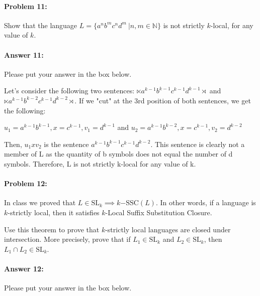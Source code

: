\documentclass[10pt]{article}
\newenvironment{AnswerBox}{\begin{mdframed}[style=simple]}{\end{mdframed}}
\begin{document}
\hrulefill %

\paragraph{Problem 11:}

Show that the language $L= \{a^n b^m c^n d^m\ | n, m \in \mathbb{N} \}$ is not
strictly $k$-local, for any value of $k$.

\paragraph{Answer 11:} Please put your answer in the box below.


\begin{AnswerBox}%
Let's consider the following two sentences: $\ltimes a^{k-1} b^{k-1} c^{k-1} d^{k-1} \rtimes$ and $\ltimes a^{k-1} b^{k-2} c^{k-1} d^{k-2}  \rtimes$. If we "cut" at the 3rd position of both sentences, we get the following:

$u_{1} = a^{k-1} b^{k-1}, x = c^{k-1}, v_{1} = d^{k-1}$ and $u_{2} = a^{k-1} b^{k-2}, x = c^{k-1}, v_{2} = d^{k-2}$

Then, $u_{1} x v_{2}$ is the sentence $a^{k-1} b^{k-1} c^{k-1} d^{k-2}$. This sentence is clearly not a member of L as the quantity of b symbols does not equal the number of d symbols. Therefore, L is not strictly k-local for any value of k.


    
\end{AnswerBox}%


\hrulefill %

\paragraph{Problem 12:}

In class we proved that
$L \in \mathrm{SL}_k \implies k\mathrm{-SSC}(L)$. In other words, if a
language is $k$-strictly local, then it satisfies $k$-Local Suffix Substitution
Closure.

Use this theorem to prove that $k$-strictly local languages
are closed under intersection. More precisely, prove that if
$L_1 \in \mathrm{SL}_k$ and $L_2 \in \mathrm{SL}_k$, then
$L_1 \cap L_2 \in \mathrm{SL}_k$.

\paragraph{Answer 12:}  Please put your answer in the box below.
\end{document}
